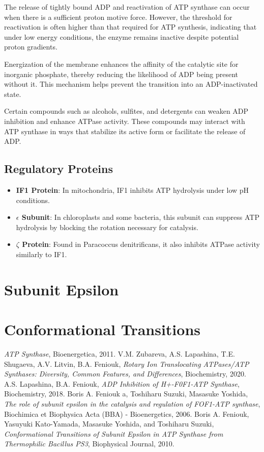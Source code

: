\documentclass{article}
\begin{document}
The release of tightly bound ADP and reactivation of ATP synthase can occur when there is a sufficient proton motive force. However, the threshold for reactivation is often higher than that required for ATP synthesis, indicating that under low energy conditions, the enzyme remains inactive despite potential proton gradients.

Energization of the membrane enhances the affinity of the catalytic site for inorganic phosphate, thereby reducing the likelihood of ADP being present without it. This mechanism helps prevent the transition into an ADP-inactivated state.

Certain compounds such as alcohols, sulfites, and detergents can weaken ADP inhibition and enhance ATPase activity. These compounds may interact with ATP synthase in ways that stabilize its active form or facilitate the release of ADP.

\subsection{Regulatory Proteins}

\begin{itemize}
    \item  \textbf{IF1 Protein}: In mitochondria, IF1 inhibits ATP hydrolysis under low pH conditions.
    \item \textbf{$\epsilon$ Subunit}: In chloroplasts and some bacteria, this subunit can suppress ATP hydrolysis by blocking the rotation necessary for catalysis.
    \item \textbf{$\zeta$ Protein}: Found in Paracoccus denitrificans, it also inhibits ATPase activity similarly to IF1.
\end{itemize}

\section{Subunit Epsilon}



\section{Conformational Transitions}

\begin{thebibliography}{9}
     \emph{ATP Synthase}, Bioenergetica, 2011.
     V.M. Zubareva, A.S. Lapashina, T.E. Shugaeva, A.V. Litvin, B.A. Feniouk, \emph{Rotary Ion Translocating ATPases/ATP Synthases: Diversity, Common Features, and Differences}, Biochemistry, 2020.
     A.S. Lapashina, B.A. Feniouk, \emph{ADP Inhibition of H+-F0F1-ATP Synthase}, Biochemistry, 2018.
     Boris A. Feniouk a, Toshiharu Suzuki, Masasuke Yoshida, \emph{The role of subunit epsilon in the catalysis and regulation of FOF1-ATP synthase}, Biochimica et Biophysica Acta (BBA) - Bioenergetics, 2006.
     Boris A. Feniouk, Yasuyuki Kato-Yamada, Masasuke Yoshida, and Toshiharu Suzuki, \emph{Conformational Transitions of Subunit Epsilon in ATP Synthase from Thermophilic Bacillus PS3}, Biophysical Journal, 2010.
\end{thebibliography}
\end{document}
